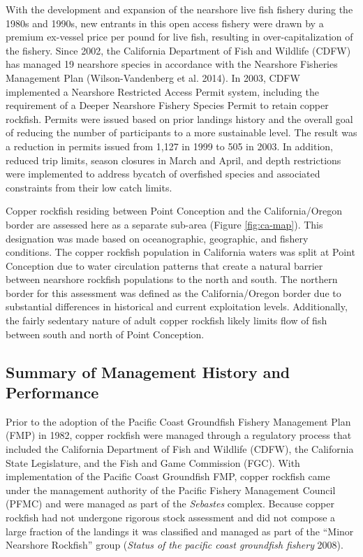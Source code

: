 \documentclass[11pt,
  english,
  letterpaper,
]{article}
\begin{document}
With the development and expansion of the nearshore live fish fishery during the 1980s and 1990s, new entrants in this open access fishery were drawn by a premium ex-vessel price per pound for live fish, resulting in over-capitalization of the fishery. Since 2002, the California Department of Fish and Wildlife (CDFW) has managed 19 nearshore species in accordance with the Nearshore Fisheries Management Plan (Wilson-Vandenberg et al. 2014). In 2003, CDFW implemented a Nearshore Restricted Access Permit system, including the requirement of a Deeper Nearshore Fishery Species Permit to retain copper rockfish. Permits were issued based on prior landings history and the overall goal of reducing the number of participants to a more sustainable level. The result was a reduction in permits issued from 1,127 in 1999 to 505 in 2003. In addition, reduced trip limits, season closures in March and April, and depth restrictions were implemented to address bycatch of overfished species and associated constraints from their low catch limits.

Copper rockfish residing between Point Conception and the California/Oregon border are assessed here as a separate sub-area (Figure \ref{fig:ca-map}). This designation was made based on oceanographic, geographic, and fishery conditions. The copper rockfish population in California waters was split at Point Conception due to water circulation patterns that create a natural barrier between nearshore rockfish populations to the north and south. The northern border for this assessment was defined as the California/Oregon border due to substantial differences in historical and current exploitation levels. Additionally, the fairly sedentary nature of adult copper rockfish likely limits flow of fish between south and north of Point Conception.

\hypertarget{summary-of-management-history-and-performance}{%
\subsection{Summary of Management History and Performance}\label{summary-of-management-history-and-performance}}

Prior to the adoption of the Pacific Coast Groundfish Fishery Management Plan (FMP) in 1982, copper rockfish were managed through a regulatory process that included the California Department of Fish and Wildlife (CDFW), the California State Legislature, and the Fish and Game Commission (FGC). With implementation of the Pacific Coast Groundfish FMP, copper rockfish came under the management authority of the Pacific Fishery Management Council (PFMC) and were managed as part of the \emph{Sebastes} complex. Because copper rockfish had not undergone rigorous stock assessment and did not compose a large fraction of the landings it was classified and managed as part of the ``Minor Nearshore Rockfish'' group (\emph{Status of the pacific coast groundfish fishery} 2008).
\end{document}
